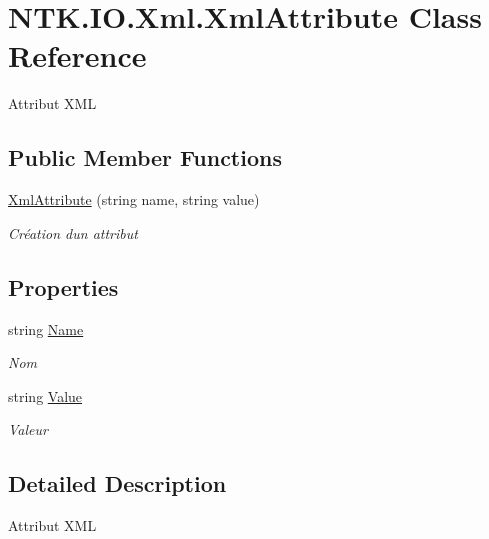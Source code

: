 \hypertarget{class_n_t_k_1_1_i_o_1_1_xml_1_1_xml_attribute}{}\section{N\+T\+K.\+I\+O.\+Xml.\+Xml\+Attribute Class Reference}
\label{class_n_t_k_1_1_i_o_1_1_xml_1_1_xml_attribute}


Attribut X\+ML  


\subsection*{Public Member Functions}
\begin{DoxyCompactItemize}
\item 
\mbox{\hyperlink{class_n_t_k_1_1_i_o_1_1_xml_1_1_xml_attribute_afe2227ace97b20f0c14f13c1b61f0131}{Xml\+Attribute}} (string name, string value)
\begin{DoxyCompactList}\small\item\em Création d\textquotesingle{}un attribut \end{DoxyCompactList}\end{DoxyCompactItemize}
\subsection*{Properties}
\begin{DoxyCompactItemize}
\item 
string \mbox{\hyperlink{class_n_t_k_1_1_i_o_1_1_xml_1_1_xml_attribute_a72191c90f363e01a2f6c4360fc5f7ab5}{Name}}
\begin{DoxyCompactList}\small\item\em Nom \end{DoxyCompactList}\item 
string \mbox{\hyperlink{class_n_t_k_1_1_i_o_1_1_xml_1_1_xml_attribute_af901ded7cbb9c27d5f8f246a9263f1f6}{Value}}
\begin{DoxyCompactList}\small\item\em Valeur \end{DoxyCompactList}\end{DoxyCompactItemize}


\subsection{Detailed Description}
Attribut X\+ML 



